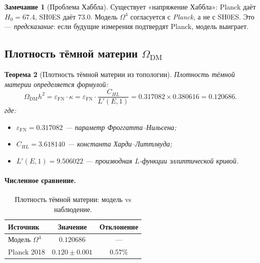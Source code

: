 \documentclass[11pt,a4paper]{article}
\newcommand{\Om}{\Omega^4}
\newcommand{\epsFN}{\varepsilon_{\text{FN}}}
\newtheorem{theorem}{Теорема}[section]
\theoremstyle{definition}
\newtheorem{remark}[theorem]{Замечание}
\begin{document}
\begin{remark}[Проблема Хаббла]
\label{rem:hubble-tension}
Существует «напряжение Хаббла»: Planck даёт $H_0 = 67.4$, 
SH0ES даёт $73.0$. Модель $\Om$ согласуется с 
\emph{Planck}, а не с SH0ES. Это — \emph{предсказание}: 
если будущие измерения подтвердят Planck, модель выиграет.
\end{remark}

\subsection{Плотность тёмной материи $\Omega_{\text{DM}}$}
\label{subsec:omega-dm}

\begin{theorem}[Плотность тёмной материи из топологии]
\label{thm:omega-dm}
Плотность тёмной материи определяется формулой:
\begin{equation}
    \boxed{
    \Omega_{\text{DM}} h^2 = \epsFN \cdot \kappa
    = \epsFN \cdot \frac{C_{HL}}{L'(E, 1)}
    = 0.317082 \times 0.380616 = 0.120686.
    }
    \label{eq:omega-dm-main}
\end{equation}
где:
\begin{itemize}
    \item $\epsFN = 0.317082$ — параметр Фроггатта--Нильсена;
    \item $C_{HL} = 3.618140$ — константа Харди--Литтлвуда;
    \item $L'(E, 1) = 9.506022$ — производная $L$-функции 
          эллиптической кривой.
\end{itemize}
\end{theorem}

\paragraph{Численное сравнение.}
\begin{table}[htbp]
\centering
\caption{Плотность тёмной материи: модель vs наблюдение.}
\label{tab:omega-dm-comparison}
\begin{tabular}{lcc}
\toprule
Источник & Значение & Отклонение \\ 
\midrule
Модель $\Om$ & $0.120686$ & --- \\[0.3em]
Planck 2018 & $0.120 \pm 0.001$ & $0.57\%$ \\ 
\bottomrule
\end{tabular}
\end{table}
\end{document}
